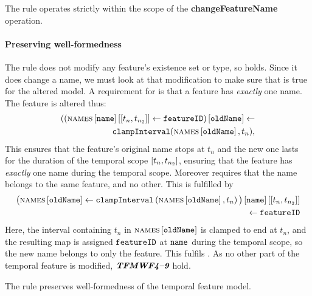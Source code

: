 \begin{lemma}
   The  rule operates strictly within the scope of the \textbf{changeFeatureName} operation.
   \label{lemma:change-feature-name-scope}
\end{lemma}

\paragraph{Preserving well-formedness}
The rule does not modify any feature's existence set or type, so  holds. Since it does change a name, we must look at that modification to make sure that  is true for the altered model. A requirement for  is that a feature has \emph{exactly} one name. 
The feature is altered thus:
\[
   \begin{split}
        (\lookup{\left(\lookup{\lookup{\names{}}{\var{name}}}{\interval{t_n}{t_{n_2}}} \assign \var{featureID}\right)}{\var{oldName}} \assign \\
        \var{clampInterval}(\lookup{\names}{\var{oldName}}, t_n), \\
   \end{split}
\]
This ensures that the feature's original name stops at $t_n$ and the new one lasts for the duration of the temporal scope $\interval{t_n}{t_{n_2}}$, ensuring that the feature has \emph{exactly} one name during the temporal scope.
Moreover  requires that the name belongs to the same feature, and no other. This is fulfilled by 
\[
   \begin{split}
        \lookup{\lookup{\big(\lookup{\names{}}{\var{oldName}} \assign 
        \var{clampInterval}\left(\lookup{\names}{\var{oldName}}, t_n\right) \big)}{\var{name}}}{\interval{t_n}{t_{n_2}}} \\
        \assign \var{featureID} \\
   \end{split}
\]
Here, the interval containing $t_n$ in $\textsc{names} \left[ \texttt{oldName} \right]$ is clamped to end at $t_n$, and the resulting map is assigned $\texttt{featureID}$ at $\texttt{name}$ during the temporal scope, so the new name belongs to only the feature. This fulfils .
As no other part of the temporal feature is modified, $\textit{\textbf{TFMWF4\textendash 9}}$ hold.
\\

\begin{lemma}
   The  rule preserves well-formedness of the temporal feature model. 
   \label{lemma:change-feature-name-well-formed}
\end{lemma}

